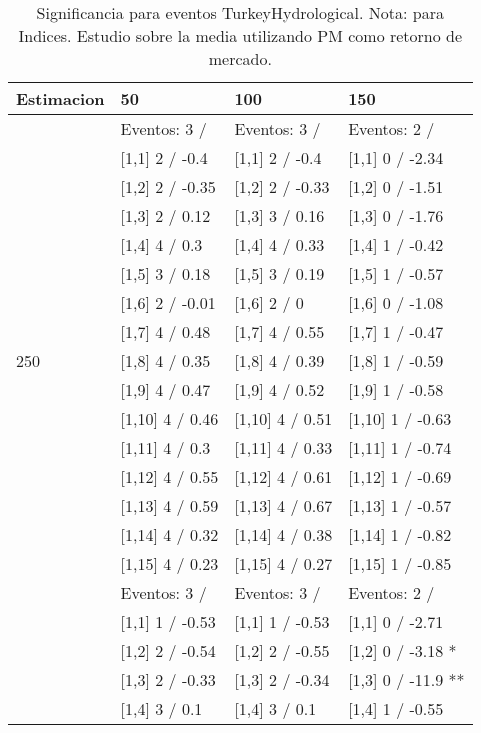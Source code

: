 \begin{table}

\caption{Significancia para eventos TurkeyHydrological. Nota: para Indices. Estudio sobre la media utilizando PM como retorno de mercado.}
\centering
\begin{tabular}[t]{llll}
\toprule
Estimacion & 50 & 100 & 150\\
\midrule
 & Eventos:  3 / & Eventos:  3 / & Eventos:  2 /\\
 & {}[1,1] 2  / -0.4 & {}[1,1] 2  / -0.4 & {}[1,1] 0  / -2.34\\
 & {}[1,2] 2  / -0.35 & {}[1,2] 2  / -0.33 & {}[1,2] 0  / -1.51\\
 & {}[1,3] 2  / 0.12 & {}[1,3] 3  / 0.16 & {}[1,3] 0  / -1.76\\
 & {}[1,4] 4  / 0.3 & {}[1,4] 4  / 0.33 & {}[1,4] 1  / -0.42\\
\addlinespace
 & {}[1,5] 3  / 0.18 & {}[1,5] 3  / 0.19 & {}[1,5] 1  / -0.57\\
 & {}[1,6] 2  / -0.01 & {}[1,6] 2  / 0 & {}[1,6] 0  / -1.08\\
 & {}[1,7] 4  / 0.48 & {}[1,7] 4  / 0.55 & {}[1,7] 1  / -0.47\\
250 & {}[1,8] 4  / 0.35 & {}[1,8] 4  / 0.39 & {}[1,8] 1  / -0.59\\
 & {}[1,9] 4  / 0.47 & {}[1,9] 4  / 0.52 & {}[1,9] 1  / -0.58\\
\addlinespace
 & {}[1,10] 4  / 0.46 & {}[1,10] 4  / 0.51 & {}[1,10] 1  / -0.63\\
 & {}[1,11] 4  / 0.3 & {}[1,11] 4  / 0.33 & {}[1,11] 1  / -0.74\\
 & {}[1,12] 4  / 0.55 & {}[1,12] 4  / 0.61 & {}[1,12] 1  / -0.69\\
 & {}[1,13] 4  / 0.59 & {}[1,13] 4  / 0.67 & {}[1,13] 1  / -0.57\\
 & {}[1,14] 4  / 0.32 & {}[1,14] 4  / 0.38 & {}[1,14] 1  / -0.82\\
\addlinespace
 & {}[1,15] 4  / 0.23 & {}[1,15] 4  / 0.27 & {}[1,15] 1  / -0.85\\
 & Eventos:  3 / & Eventos:  3 / & Eventos:  2 /\\
 & {}[1,1] 1  / -0.53 & {}[1,1] 1  / -0.53 & {}[1,1] 0  / -2.71\\
 & {}[1,2] 2  / -0.54 & {}[1,2] 2  / -0.55 & {}[1,2] 0  / -3.18 *\\
 & {}[1,3] 2  / -0.33 & {}[1,3] 2  / -0.34 & {}[1,3] 0  / -11.9 **\\
\addlinespace
 & {}[1,4] 3  / 0.1 & {}[1,4] 3  / 0.1 & {}[1,4] 1  / -0.55\\

\end{tabular}
\end{table}
